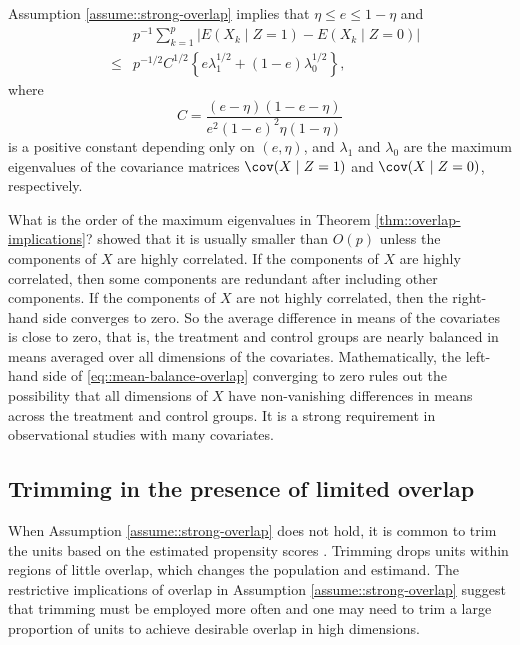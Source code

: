 \begin{theorem}\label{thm::overlap-implications}
Assumption \ref{assume::strong-overlap} implies that $\eta \leq e \leq 1-\eta$ and
\begin{eqnarray} 
&&p^{-1} \sum_{k=1}^p \big | E(X_k\mid Z=1) - E(X_k\mid Z=0)  \Big |   \nonumber  \\
& \leq &  
p^{-1/2} C^{1/2}  \left\{    e\lambda_1^{1/2} + (1-e)  \lambda_0^{1/2}  \right\} , \label{eq::mean-balance-overlap}
\end{eqnarray}
where 
$$
C  = \frac{  (e-\eta)(1-e-\eta)   }{  e^2(1-e)^2 \eta (1-\eta)      }
$$
is a positive constant depending only on $(e, \eta)$, and $\lambda_1$ and $\lambda_0$ are the maximum eigenvalues of the covariance matrices $ \cov(X\mid Z=1)$ and $\cov(X\mid Z=0) $, respectively. 
\end{theorem}

What is the order of the maximum eigenvalues in Theorem \ref{thm::overlap-implications}? \citet{d2017overlap} showed that it is usually smaller than $O(p)$ unless the components of $X$ are highly correlated. If the components of $X$ are highly correlated, then some components are redundant after including other components. If the components of $X$ are not highly correlated, then the right-hand side converges to zero. So the average difference in means of the covariates is close to zero, that is, the treatment and control groups are nearly balanced in means averaged over all dimensions of the covariates. Mathematically,  the left-hand side of  \eqref{eq::mean-balance-overlap} converging to zero rules out the possibility that all dimensions of $X$ have non-vanishing differences in means across the treatment and control groups. 
It is a strong requirement in observational studies with many covariates. 



\subsection{Trimming in the presence of limited overlap}\label{sec::trimming-overlap}

When Assumption \ref{assume::strong-overlap}  does not hold, it is common to trim the units based on the estimated propensity scores \citep{crump2009dealing, yang2018asymptotic}. Trimming drops units within regions of little overlap, which changes the population and estimand. The restrictive implications of overlap in Assumption \ref{assume::strong-overlap} suggest that trimming must be employed more often and one may need to trim a large proportion of units to achieve desirable overlap in high dimensions. 


